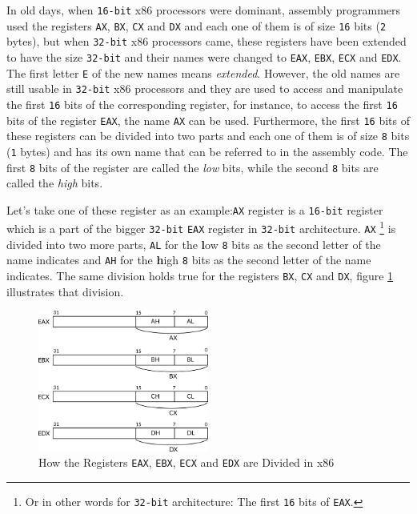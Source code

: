 In old days, when \lstinline!16-bit! x86 processors were dominant,
assembly programmers used the registers \lstinline!AX!, \lstinline!BX!,
\lstinline!CX! and \lstinline!DX! and each one of them is of size
\lstinline!16! bits (\lstinline!2! bytes), but when \lstinline!32-bit!
x86 processors came, these registers have been extended to have the size
\lstinline!32-bit! and their names were changed to \lstinline!EAX!,
\lstinline!EBX!, \lstinline!ECX! and \lstinline!EDX!. The first letter
\lstinline!E! of the new names means \emph{extended}. However, the old
names are still usable in \lstinline!32-bit! x86 processors and they are
used to access and manipulate the first \lstinline!16! bits of the
corresponding register, for instance, to access the first \lstinline!16!
bits of the register \lstinline!EAX!, the name \lstinline!AX! can be
used. Furthermore, the first \lstinline!16! bits of these registers can
be divided into two parts and each one of them is of size \lstinline!8!
bits (\lstinline!1! bytes) and has its own name that can be referred to
in the assembly code. The first \lstinline!8! bits of the register are
called the \emph{low} bits, while the second \lstinline!8! bits are
called the \emph{high} bits.

Let's take one of these register as an example:\lstinline!AX! register
is a \lstinline!16-bit! register which is a part of the bigger
\lstinline!32-bit! \lstinline!EAX! register in \lstinline!32-bit!
architecture. \lstinline!AX! \footnote{Or in other words for
  \lstinline!32-bit! architecture: The first \lstinline!16! bits of
  \lstinline!EAX!.} is divided into two more parts, \lstinline!AL! for
the \textbf{l}ow \lstinline!8! bits as the second letter of the name
indicates and \lstinline!AH! for the \textbf{h}igh \lstinline!8! bits as
the second letter of the name indicates. The same division holds true
for the registers \lstinline!BX!, \lstinline!CX! and \lstinline!DX!,
figure \ref{fig:26012022_0} illustrates that division.

\begin{figure}
\centering
\includegraphics[width=0.50000\textwidth]{Figures/bootloader-ch/Fig26012022_0.png}
\caption{How the Registers \lstinline!EAX!, \lstinline!EBX!,
\lstinline!ECX! and \lstinline!EDX! are Divided in
x86}\label{fig:26012022_0}
\end{figure}


